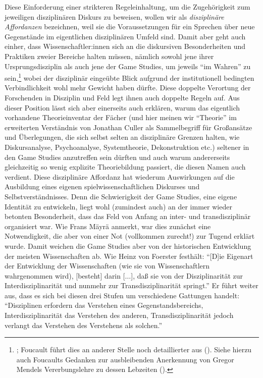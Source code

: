 \documentclass{scrartcl}
\begin{document}
Diese Einforderung einer strikteren Regeleinhaltung, um die Zugehörigkeit zum jeweiligen disziplinären Diskurs zu beweisen, wollen wir als \textit{disziplinäre Affordanzen} bezeichnen, weil sie die Voraussetzungen für ein Sprechen über neue Gegenstände im eigentlichen disziplinären Umfeld sind.
Damit aber geht auch einher, dass Wissenschaftler:innen sich an die diskursiven Besonderheiten und Praktiken zweier Bereiche halten müssen, nämlich sowohl jene ihrer Ursprungsdisziplin als auch jene der Game Studies, um jeweils \enquote{im Wahren} zu sein,\footnote{\autocite[][S.~24]{foucault_ordnung_1993}; Foucault führt dies an anderer Stelle noch detaillierter aus (\autocite[][S.~261]{foucault_archaologie_2011}). Siehe hierzu auch Foucaults Gedanken zur ausbleibenden Anerkennung von Gregor Mendels Vererbungslehre zu dessen Lebzeiten (\autocite[][S.~24--25]{foucault_ordnung_1993}).} wobei der disziplinär eingeübte Blick aufgrund der institutionell bedingten Verbindlichkeit wohl mehr Gewicht haben dürfte.
Diese doppelte Verortung der Forschenden in Disziplin und Feld legt ihnen auch doppelte Regeln auf.
Aus dieser Position lässt sich aber einerseits auch erklären, warum das eigentlich vorhandene Theorieinventar der Fächer (und hier meinen wir \enquote{Theorie} im erweiterten Verständnis von Jonathan Culler als Sammelbegriff für Großansätze und Überlegungen, die sich selbst selten an disziplinäre Grenzen halten, wie Diskursanalyse, Psychoanalyse, Systemtheorie, Dekonstruktion etc.\autocite[Vgl.][S.~11--13]{culler_literaturtheorie_2017}) seltener in den Game Studies anzutreffen sein dürften und auch warum andererseits gleichzeitig so wenig explizite Theoriebildung passiert, die diesen Namen auch verdient.
Diese disziplinäre Affordanz hat wiederum Auswirkungen auf die Ausbildung eines eigenen spielwissenschaftlichen Diskurses und Selbstverständnisses.
Denn die Schwierigkeit der Game Studies, eine eigene Identität zu entwickeln, liegt wohl (zumindest auch) an der immer wieder betonten Besonderheit, dass das Feld von Anfang an inter- und transdisziplinär organisiert war.
Wie Frans Mäyrä anmerkt, war dies zunächst eine Notwendigkeit, die aber von einer Not (vollkommen zurecht!) zur Tugend erklärt wurde.\autocite[Vgl.][S.~313]{mayra_getting_2009}
Damit weichen die Game Studies aber von der historischen Entwicklung der meisten Wissenschaften ab.
Wie Heinz von Foerster festhält:
\enquote{[D]ie Eigenart der Entwicklung der Wissenschaften (wie sie von Wissenschaftlern wahrgenommen wird), [besteht] darin [$\ldots$], daß sie von der Disziplinarität zur Interdisziplinarität und nunmehr zur Transdisziplinarität springt.}\autocite[][S.~282]{von_foerster_verstehen_2020}
Er führt weiter aus, dass es sich bei diesen drei Stufen um verschiedene Gattungen handelt:
\enquote{Disziplinen erfordern das Verstehen eines Gegenstandsbereichs, Interdisziplinarität das Verstehen des anderen, Transdisziplinarität jedoch verlangt das Verstehen des Verstehens als solchen.}\autocite[][S.~285]{von_foerster_verstehen_2020}
\end{document}
